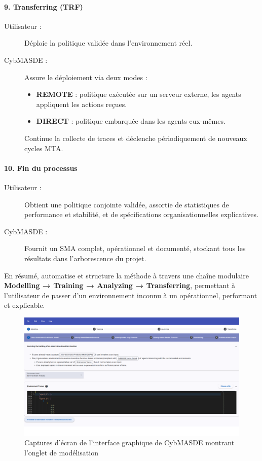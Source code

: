 \paragraph{9. Transferring (TRF)}
\begin{description}
  \item[Utilisateur :] Déploie la politique validée dans l’environnement réel.
  \item[CybMASDE :] Assure le déploiement via deux modes :
    \begin{itemize}
      \item \textbf{REMOTE} : politique exécutée sur un serveur externe, les agents appliquent les actions reçues.
      \item \textbf{DIRECT} : politique embarquée dans les agents eux-mêmes.
    \end{itemize}
    Continue la collecte de traces et déclenche périodiquement de nouveaux cycles MTA.
\end{description}

\paragraph{10. Fin du processus}
\begin{description}
  \item[Utilisateur :] Obtient une politique conjointe validée, assortie de statistiques de performance et stabilité, et de spécifications organisationnelles explicatives.
  \item[CybMASDE :] Fournit un SMA complet, opérationnel et documenté, stockant tous les résultats dans l’arborescence du projet.
\end{description}

\medskip
En résumé,  automatise et structure la méthode  à travers une chaîne modulaire \textbf{Modelling → Training → Analyzing → Transferring}, permettant à l’utilisateur de passer d’un environnement inconnu à un  opérationnel, performant et explicable.


\begin{figure}
  \centering
  \includegraphics[width=\linewidth]{figures/CybMASDE_2.png}
  \caption{Captures d'écran de l'interface graphique de CybMASDE montrant l'onglet de modélisation}
  \label{fig:cybmasde_screenshot}
\end{figure}


